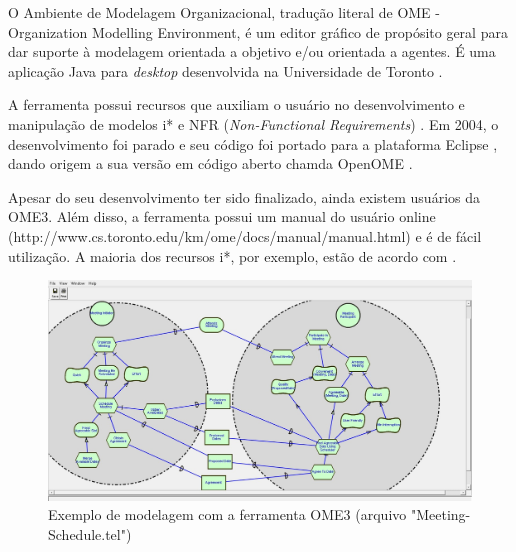 
                O Ambiente de Modelagem Organizacional, tradução literal de OME - Organization Modelling Environment, é um editor gráfico de propósito geral para dar suporte à modelagem orientada a objetivo e/ou orientada a agentes.
                É uma aplicação Java para \emph{desktop} desenvolvida na Universidade de Toronto \cite{ome2013}.

                A ferramenta possui recursos que auxiliam o usuário no desenvolvimento e manipulação de modelos i* e NFR (\emph{Non-Functional Requirements}) \cite{chung2000non}.
                Em 2004, o desenvolvimento foi parado e seu código foi portado para a plataforma Eclipse \cite{eclipse}, dando origem a sua versão em código aberto chamda OpenOME \cite{horkoff2011openome}.

                Apesar do seu desenvolvimento ter sido finalizado, ainda existem usuários da OME3.
                Além disso, a ferramenta possui um manual do usuário online (http://www.cs.toronto.edu/km/ome/docs/manual/manual.html) e é de fácil utilização. A maioria dos recursos i*, por exemplo, estão de acordo com \cite{yu1995modelling}.

                \begin{figure}[h!]
                    \centering
                        \includegraphics[width=0.8\linewidth]{Figuras/istar/tela-ome.jpg}
                        \caption{Exemplo de modelagem com a ferramenta OME3 (arquivo "Meeting-Schedule.tel")}
                        \label{fig:tela-ome}
                \end{figure}

